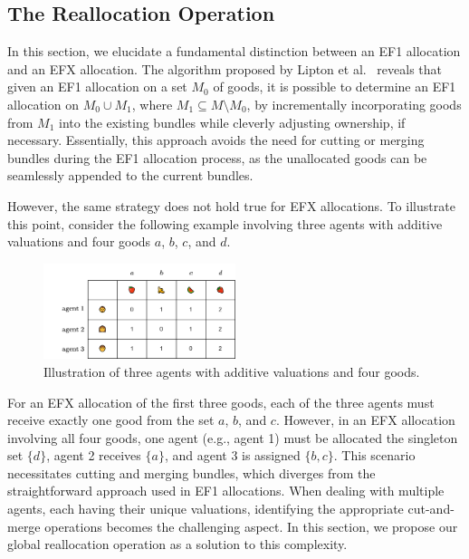 \documentclass{article}
\begin{document}
\subsection{The Reallocation Operation}

In this section, we elucidate a fundamental distinction between an EF1 allocation and an EFX allocation. The algorithm proposed by Lipton et al.~\cite{10.1145/988772.988792} reveals that given an EF1 allocation on a set $M_0$ of goods, it is possible to determine an EF1 allocation on $M_0 \cup M_1$, where $M_1 \subseteq M \setminus M_0$, by incrementally incorporating goods from $M_1$ into the existing bundles while cleverly adjusting ownership, if necessary. Essentially, this approach avoids the need for cutting or merging bundles during the EF1 allocation process, as the unallocated goods can be seamlessly appended to the current bundles.

However, the same strategy does not hold true for EFX allocations. To illustrate this point, consider the following example involving three agents with additive valuations and four goods \(a\), \(b\), \(c\), and \(d\).

\begin{figure}[htbp]
    \centering
    \includegraphics[width=0.5\textwidth]{image/EFX2.png}
    \caption{Illustration of three agents with additive valuations and four goods.}
    \label{fig:example3}
\end{figure}

For an EFX allocation of the first three goods, each of the three agents must receive exactly one good from the set \(a\), \(b\), and \(c\). However, in an EFX allocation involving all four goods, one agent (e.g., agent 1) must be allocated the singleton set \(\{d\}\), agent 2 receives \(\{a\}\), and agent 3 is assigned \(\{b, c\}\). This scenario necessitates cutting and merging bundles, which diverges from the straightforward approach used in EF1 allocations. When dealing with multiple agents, each having their unique valuations, identifying the appropriate cut-and-merge operations becomes the challenging aspect. In this section, we propose our global reallocation operation as a solution to this complexity.
\end{document}
